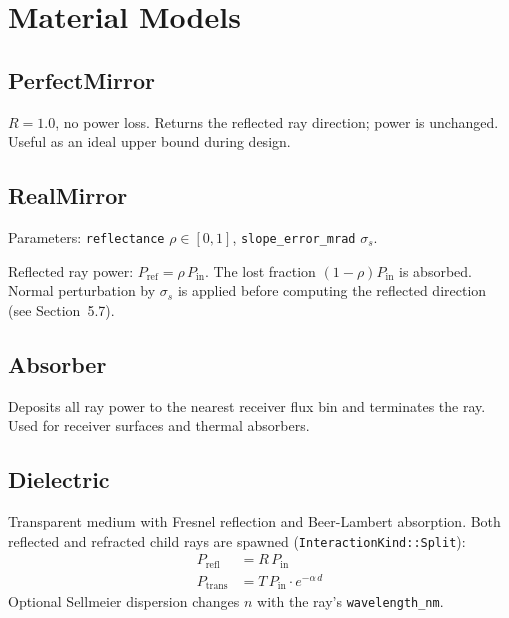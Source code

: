 \documentclass[12pt,a4paper]{report}
\begin{document}
\chapter{Material Models}

\section{PerfectMirror}

$R = 1.0$, no power loss.  Returns the reflected ray direction; power is unchanged.
Useful as an ideal upper bound during design.

\section{RealMirror}

Parameters: \texttt{reflectance} $\rho \in [0,1]$, \texttt{slope\_error\_mrad} $\sigma_s$.

Reflected ray power: $P_{\text{ref}} = \rho\, P_{\text{in}}$.  The lost fraction
$(1-\rho)P_{\text{in}}$ is absorbed.  Normal perturbation by $\sigma_s$ is applied before
computing the reflected direction (see Section~5.7).

\section{Absorber}

Deposits all ray power to the nearest receiver flux bin and terminates the ray.  Used for
receiver surfaces and thermal absorbers.

\section{Dielectric}

Transparent medium with Fresnel reflection and Beer-Lambert absorption.  Both reflected
and refracted child rays are spawned (\texttt{InteractionKind::Split}):
\begin{align*}
  P_{\text{refl}} &= R\,P_{\text{in}} \\
  P_{\text{trans}} &= T\,P_{\text{in}} \cdot e^{-\alpha\, d}
\end{align*}
Optional Sellmeier dispersion changes $n$ with the ray's \texttt{wavelength\_nm}.
\end{document}
